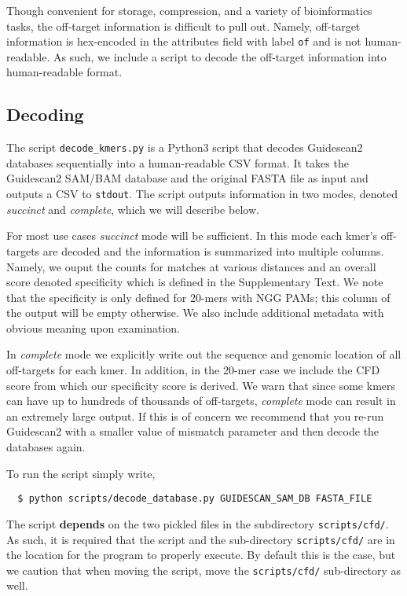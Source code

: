 \documentclass[11pt]{article}
\begin{document}
Though convenient for storage, compression, and a variety of
bioinformatics tasks, the off-target information is difficult to pull
out. Namely, off-target information is hex-encoded in the attributes
field with label \texttt{of} and is not human-readable. As such, we
include a script to decode the off-target information into
human-readable format.

\subsection{Decoding}

The script \texttt{decode\_kmers.py} is a Python3 script that decodes
Guidescan2 databases sequentially into a human-readable CSV format. It
takes the Guidescan2 SAM/BAM database and the original FASTA file as
input and outputs a CSV to \texttt{stdout}. The script outputs
information in two modes, denoted {\it succinct} and {\it
  complete}, which we will describe below.

For most use cases {\it succinct} mode will be sufficient. In this
mode each kmer's off-targets are decoded and the information is
summarized into multiple columns. Namely, we ouput the counts for
matches at various distances and an overall score denoted specificity
which is defined in the Supplementary Text. We note that the
specificity is only defined for 20-mers with NGG PAMs; this column of
the output will be empty otherwise. We also include additional
metadata with obvious meaning upon examination.

In {\it complete} mode we explicitly write out the sequence and
genomic location of all off-targets for each kmer. In addition, in the
20-mer case we include the CFD score from which our specificity score
is derived. We warn that since some kmers can have up to hundreds of
thousands of off-targets, {\it complete} mode can result in an
extremely large output. If this is of concern we recommend that you
re-run Guidescan2 with a smaller value of mismatch parameter and then
decode the databases again.

To run the script simply write,
\begin{verbatim}
  $ python scripts/decode_database.py GUIDESCAN_SAM_DB FASTA_FILE 
\end{verbatim}
The script \textbf{depends} on the two pickled files in the
subdirectory \texttt{scripts/cfd/}. As such, it is required that the
script and the sub-directory \texttt{scripts/cfd/} are in the location
for the program to properly execute. By default this is the
case, but we caution that when moving the script, move the
\texttt{scripts/cfd/} sub-directory as well.
\end{document}
